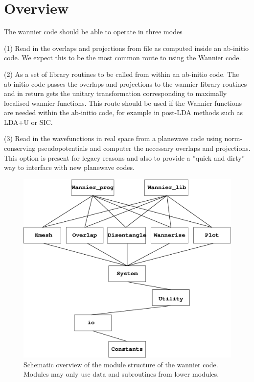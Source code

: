 \chapter{Overview}
The wannier code should be able to operate in three modes

(1) Read in the overlaps and projections from file as computed 
inside an ab-initio code. We expect this to be the most common route to using the Wannier code.


(2) As a set of library routines to be called from within an ab-initio code. 
The ab-initio code passes the overlaps and projections to the wannier library routines
and in return gets the unitary transformation corresponding to maximally localised wannier functions.
This route should be used if the Wannier functions are needed within the ab-initio code, for example
in post-LDA methods such as LDA+U or SIC.


(3) Read in the
wavefunctions in real space from a planewave code using norm-conserving
pseudopotentials and computer the necessary overlaps and projections.
This option is present for legacy reasons and also to provide a ''quick and dirty'' way to
interface with new planewave codes.
                                                                                                                         


\begin{figure}
\begin{center}
\includegraphics[width=6in]{overview.eps}
\caption{Schematic overview of the module structure of the wannier code. Modules may only use data
and subroutines from lower modules.}
\label{structure}
\end{center}
\end{figure}
